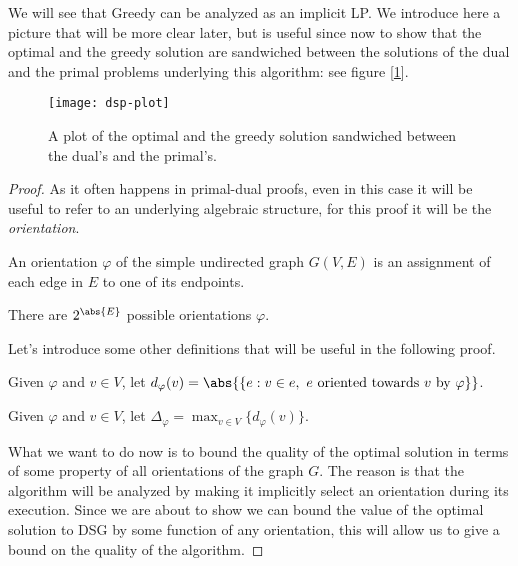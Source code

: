 \begin{obs}
    We will see that Greedy can be analyzed as an implicit LP. We introduce here a picture that will be more clear later, but is useful since now to show that the optimal and the greedy solution are sandwiched between the solutions of the dual and the primal problems underlying this algorithm: see figure [\ref{fig:dsp-plot}].
    \begin{figure}[h!]
        \centering
        \texttt{[image: dsp-plot]}
        \caption{A plot of the optimal and the greedy solution sandwiched between the dual's and the primal's.}
        \label{fig:dsp-plot}
    \end{figure}
\end{obs}

\begin{proof}
    As it often happens in primal-dual proofs, even in this case it will be useful to refer to an underlying algebraic structure, for this proof it will be the \textit{orientation}.
    
    \begin{defn}[Orientation]
        An orientation $\varphi$ of the simple undirected graph $G(V,E)$ is an assignment of each edge in $E$ to one of its endpoints.
    \end{defn}
    
    \obs There are $2^{\abs{E}}$ possible orientations $\varphi$.
    
    Let's introduce some other definitions that will be useful in the following proof.
    
    \begin{defn}
        Given $\varphi$ and $v \in V$, let $d_\varphi(v) = \abs{\{ e : v \in e,\ e \text{ oriented towards } v \text{ by } \varphi \}}$.
    \end{defn}
    
    \begin{defn}
        Given $\varphi$ and $v \in V$, let $\Delta_\varphi = \max_{v \in V}\{d_\varphi(v)\}$.
    \end{defn}

    \pagebreak
    
    What we want to do now is to bound the quality of the optimal solution in terms of some property of all orientations of the graph $G$. The reason is that the algorithm will be analyzed by making it implicitly select an orientation during its execution. Since we are about to show we can bound the value of the optimal solution to DSG by some function of any orientation, this will allow us to give a bound on the quality of the algorithm.
    

\end{proof}
